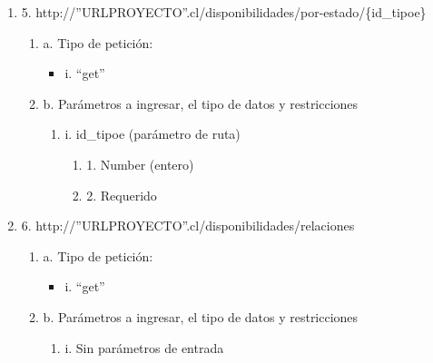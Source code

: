 \begin{enumerate}
    \item 5. http://”URLPROYECTO”.cl/disponibilidades/por-estado/\{id\_tipoe\}
    \begin{enumerate}
        \item a. Tipo de petición:
            \begin{itemize}
               \item i. “get”
            \end{itemize}
        \item b. Parámetros a ingresar, el tipo de datos y restricciones
            \begin{enumerate}
                \item i. id\_tipoe (parámetro de ruta)
                    \begin{enumerate}
                        \item 1. Number (entero)
                        \item 2. Requerido
                    \end{enumerate}
            \end{enumerate}
    \end{enumerate}

    \item 6. http://”URLPROYECTO”.cl/disponibilidades/relaciones
    \begin{enumerate}
        \item a. Tipo de petición:
            \begin{itemize}
               \item i. “get”
            \end{itemize}
        \item b. Parámetros a ingresar, el tipo de datos y restricciones
            \begin{enumerate}
                \item i. Sin parámetros de entrada
            \end{enumerate}
    \end{enumerate}


\end{enumerate}

